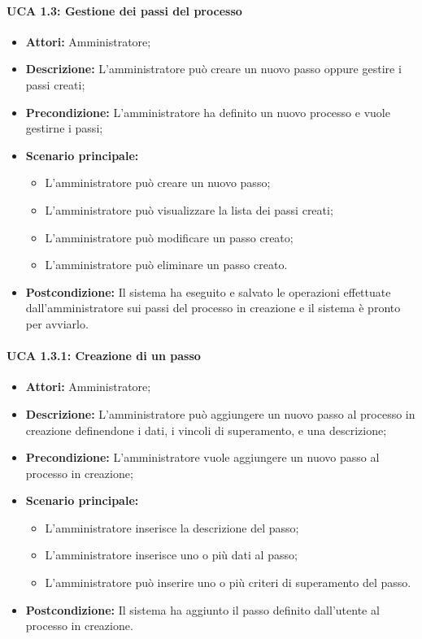 \paragraph{UCA 1.3: Gestione dei passi del processo}
\begin{itemize}
\item \textbf{Attori:}
 Amministratore;
\item \textbf{Descrizione:} 
L'amministratore può creare un nuovo passo oppure gestire i passi creati;
\item \textbf{Precondizione:} 
L'amministratore ha definito un nuovo processo e vuole gestirne i passi;
\item \textbf{Scenario principale:} 
\begin{itemize}
\item L'amministratore può creare un nuovo passo;
\item L'amministratore può visualizzare la lista dei passi creati;
\item L'amministratore può modificare un passo creato;
\item L'amministratore può eliminare un passo creato.
\end{itemize}
\item \textbf{Postcondizione:} 
Il sistema ha eseguito e salvato le operazioni effettuate dall'amministratore sui passi del processo in creazione e il sistema è pronto per avviarlo.
\end{itemize}

\paragraph{UCA 1.3.1: Creazione di un passo}
\begin{itemize}
\item \textbf{Attori:}
 Amministratore;
\item \textbf{Descrizione:} 
L'amministratore può aggiungere un nuovo passo al processo in creazione definendone i dati, i vincoli di superamento, e una descrizione;
\item \textbf{Precondizione:} 
L'amministratore vuole aggiungere un nuovo passo al processo in creazione;
\item \textbf{Scenario principale:} 
\begin{itemize}
\item L'amministratore inserisce la descrizione del passo;
\item L'amministratore inserisce uno o più dati al passo;
\item L'amministratore può inserire uno o più criteri di superamento del passo.
\end{itemize}
\item \textbf{Postcondizione:}
Il sistema ha aggiunto il passo definito dall'utente al processo in creazione.
\end{itemize}

